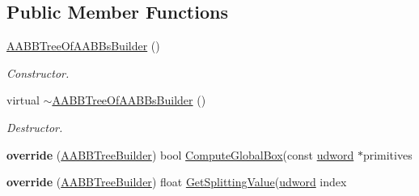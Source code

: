 \subsection*{Public Member Functions}
\begin{DoxyCompactItemize}
\item 
\hyperlink{classOpcode_1_1AABBTreeOfAABBsBuilder_a68405288663bd12f87fd1cc1f4bc313a}{A\+A\+B\+B\+Tree\+Of\+A\+A\+B\+Bs\+Builder} ()\hypertarget{classOpcode_1_1AABBTreeOfAABBsBuilder_a68405288663bd12f87fd1cc1f4bc313a}{}\label{classOpcode_1_1AABBTreeOfAABBsBuilder_a68405288663bd12f87fd1cc1f4bc313a}

\begin{DoxyCompactList}\small\item\em Constructor. \end{DoxyCompactList}\item 
virtual \hyperlink{classOpcode_1_1AABBTreeOfAABBsBuilder_a29bb36577bed10de1754a37acb38e27b}{$\sim$\+A\+A\+B\+B\+Tree\+Of\+A\+A\+B\+Bs\+Builder} ()\hypertarget{classOpcode_1_1AABBTreeOfAABBsBuilder_a29bb36577bed10de1754a37acb38e27b}{}\label{classOpcode_1_1AABBTreeOfAABBsBuilder_a29bb36577bed10de1754a37acb38e27b}

\begin{DoxyCompactList}\small\item\em Destructor. \end{DoxyCompactList}\item 
{\bfseries override} (\hyperlink{classOpcode_1_1AABBTreeBuilder}{A\+A\+B\+B\+Tree\+Builder}) bool \hyperlink{classOpcode_1_1AABBTreeBuilder_a7d9fe535e2dd4649b58b416e9ef63ae8}{Compute\+Global\+Box}(const \hyperlink{IceTypes_8h_a44c6f1920ba5551225fb534f9d1a1733}{udword} $\ast$primitives\hypertarget{classOpcode_1_1AABBTreeOfAABBsBuilder_aa706093c06b5ab298cc8e71ce35cda59}{}\label{classOpcode_1_1AABBTreeOfAABBsBuilder_aa706093c06b5ab298cc8e71ce35cda59}

\item 
{\bfseries override} (\hyperlink{classOpcode_1_1AABBTreeBuilder}{A\+A\+B\+B\+Tree\+Builder}) float \hyperlink{classOpcode_1_1AABBTreeBuilder_ab98a8fb0617c8ec21eadc51c9ff593d4}{Get\+Splitting\+Value}(\hyperlink{IceTypes_8h_a44c6f1920ba5551225fb534f9d1a1733}{udword} index\hypertarget{classOpcode_1_1AABBTreeOfAABBsBuilder_a11afaaff76e83abc45ca1f294abc8c23}{}\label{classOpcode_1_1AABBTreeOfAABBsBuilder_a11afaaff76e83abc45ca1f294abc8c23}

\end{DoxyCompactItemize}
